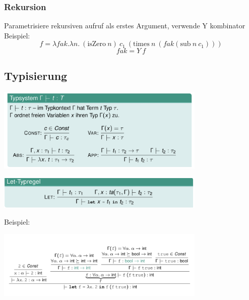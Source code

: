 \subsubsection{Rekursion}
Parametrisiere rekursiven aufruf als erstes Argument, verwende Y kombinator\\
Beispiel:\\
$$f = \lambda fak. \lambda n. \medspace (\text{isZero}\medspace n)  \medspace c_1 \medspace (\text{times} \medspace n \medspace (fak (\text{sub}\medspace n \medspace c_1)))$$
$$fak = Y \medspace f$$

\subsection{Typisierung}
\begin{center}
	\includegraphics[width=0.75\textwidth]{images/types.png}	
\end{center}
\begin{center}
		\includegraphics[width=0.75\textwidth]{images/let.png}
\end{center}
Beispiel:\\
\begin{center}
	\includegraphics[width=0.75\textwidth]{images/let_ex.png}
\end{center}

